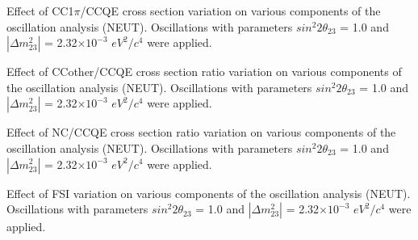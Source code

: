 %
%
%
%

\caption{ 
  Effect of CC1$\pi$/CCQE cross section variation
  on various components of the oscillation analysis (NEUT).
  Oscillations with parameters $sin^{2}2\theta_{23}$ = 1.0 and $|\Delta m^{2}_{23}|$ = 2.32$\times10^{-3}$ $eV^{2}/c^{4}$ were applied.  
}


%
%
%
%

\caption{ 
  Effect of CCother/CCQE cross section ratio variation
  on various components of the oscillation analysis (NEUT).
  Oscillations with parameters $sin^{2}2\theta_{23}$ = 1.0 and $|\Delta m^{2}_{23}|$ = 2.32$\times10^{-3}$ $eV^{2}/c^{4}$ were applied.  
}


%
%
%
%

\caption{ 
  Effect of NC/CCQE cross section ratio variation
  on various components of the oscillation analysis (NEUT).
  Oscillations with parameters $sin^{2}2\theta_{23}$ = 1.0 and $|\Delta m^{2}_{23}|$ = 2.32$\times10^{-3}$ $eV^{2}/c^{4}$ were applied.  
}

%
%
%
%


\caption{ 
  Effect of FSI variation
  on various components of the oscillation analysis (NEUT).
  Oscillations with parameters $sin^{2}2\theta_{23}$ = 1.0 and $|\Delta m^{2}_{23}|$ = 2.32$\times10^{-3}$ $eV^{2}/c^{4}$ were applied.  
}





